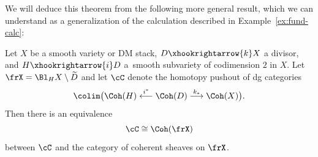 We will deduce this theorem from the following more general result, which we can understand as a generalization of the calculation described in Example~\ref{ex:fund-calc}:

\begin{Theorem}\label{thm:main-general}
	Let $X$ be a smooth variety or DM stack, $D\xhookrightarrow{k} X$ a divisor, and $H\xhookrightarrow{i}D$ a~smooth subvariety of codimension $2$ in $X$. Let $\frX = \Bl_HX\setminus \widetilde{D}$ and let $\cC$ denote the
homotopy pushout of dg categories
\begin{equation}\label{eq:pushout}
\colim\bigl(\Coh(H)\stackrel{i^*}\longleftarrow\Coh(D)\stackrel{k_*}\longrightarrow\Coh(X)\bigr).
\end{equation}
Then there is an equivalence
\[
\cC\cong\Coh(\frX)
\] between $\cC$ and the category of coherent sheaves on $\frX$.
\end{Theorem}
